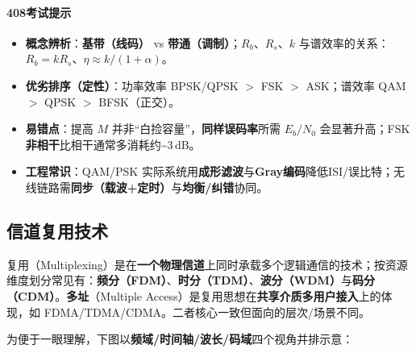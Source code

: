 \documentclass[lang=cn,newtx,10pt,scheme=chinese]{../../elegantbook}
\begin{document}
\paragraph{408考试提示}
\begin{itemize}
    \item \textbf{概念辨析}：\textbf{基带（线码）} vs \textbf{带通（调制）}；$R_b$、$R_s$、$k$ 与谱效率的关系：$R_b=kR_s$、$\eta\approx k/(1+\alpha)$。
    \item \textbf{优劣排序（定性）}：功率效率 BPSK/QPSK $>$ FSK $>$ ASK；谱效率 QAM $>$ QPSK $>$ BFSK（正交）。
    \item \textbf{易错点}：提高 $M$ 并非“白捡容量”，\textbf{同样误码率}所需 $E_b/N_0$ 会显著升高；FSK\textbf{非相干}比相干通常多消耗约\textasciitilde{}3\,dB。
    \item \textbf{工程常识}：QAM/PSK 实际系统用\textbf{成形滤波}与\textbf{Gray编码}降低ISI/误比特；无线链路需\textbf{同步（载波+定时）}与\textbf{均衡/纠错}协同。
\end{itemize}


\subsection{信道复用技术}

复用（Multiplexing）是在\textbf{一个物理信道}上同时承载多个逻辑通信的技术；按资源维度划分常见有：\textbf{频分（FDM）}、\textbf{时分（TDM）}、\textbf{波分（WDM）}与\textbf{码分（CDM）}。\textbf{多址}（Multiple Access）是复用思想在\textbf{共享介质多用户接入}上的体现，如 FDMA/TDMA/CDMA。二者核心一致但面向的层次/场景不同。

为便于一眼理解，下图以\textbf{频域/时间轴/波长/码域}四个视角并排示意：
\end{document}
